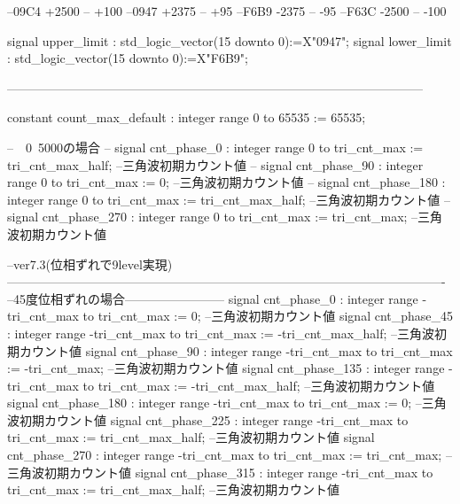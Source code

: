 \begin{mylisting}[language=VHDL,caption=ゲート信号出力モジュール,label=MMC_PWM_GEN_module_VHDL]
	--09C4 +2500 -- +100%
	--0947 +2375 -- +95%
	--F6B9 -2375 -- -95%
	--F63C -2500 -- -100%
	
	signal	upper_limit : std_logic_vector(15 downto 0):=X"0947";
	signal	lower_limit : std_logic_vector(15 downto 0):=X"F6B9";

   -----------------------------------------------------------------------------------------------------

	constant count_max_default				: integer range 0 to 65535			:= 65535; 

--　0~5000の場合
--	signal 	cnt_phase_0						: integer range 0 to tri_cnt_max		:= tri_cnt_max_half;	--三角波初期カウント値
--	signal 	cnt_phase_90					: integer range 0 to tri_cnt_max		:= 0;						--三角波初期カウント値		
--	signal 	cnt_phase_180					: integer range 0 to tri_cnt_max		:= tri_cnt_max_half;	--三角波初期カウント値		
--	signal 	cnt_phase_270					: integer range 0 to tri_cnt_max		:= tri_cnt_max;		--三角波初期カウント値	

--ver7.3(位相ずれで9level実現)----------------------------------------------------------------------------------------------------------
--45度位相ずれの場合------------------------
	signal 	cnt_phase_0						: integer range -tri_cnt_max to tri_cnt_max		:= 0;					   --三角波初期カウント値
	signal 	cnt_phase_45					: integer range -tri_cnt_max to tri_cnt_max		:= -tri_cnt_max_half;	--三角波初期カウント値
	signal 	cnt_phase_90					: integer range -tri_cnt_max to tri_cnt_max		:= -tri_cnt_max;	   --三角波初期カウント値		
	signal 	cnt_phase_135					: integer range -tri_cnt_max to tri_cnt_max		:= -tri_cnt_max_half;	--三角波初期カウント値		
	signal 	cnt_phase_180					: integer range -tri_cnt_max to tri_cnt_max		:= 0;					   --三角波初期カウント値		
	signal 	cnt_phase_225					: integer range -tri_cnt_max to tri_cnt_max		:= tri_cnt_max_half;	--三角波初期カウント値		
	signal 	cnt_phase_270					: integer range -tri_cnt_max to tri_cnt_max		:= tri_cnt_max;	   --三角波初期カウント値	
	signal 	cnt_phase_315					: integer range -tri_cnt_max to tri_cnt_max		:= tri_cnt_max_half;	--三角波初期カウント値
	

\end{mylisting}
